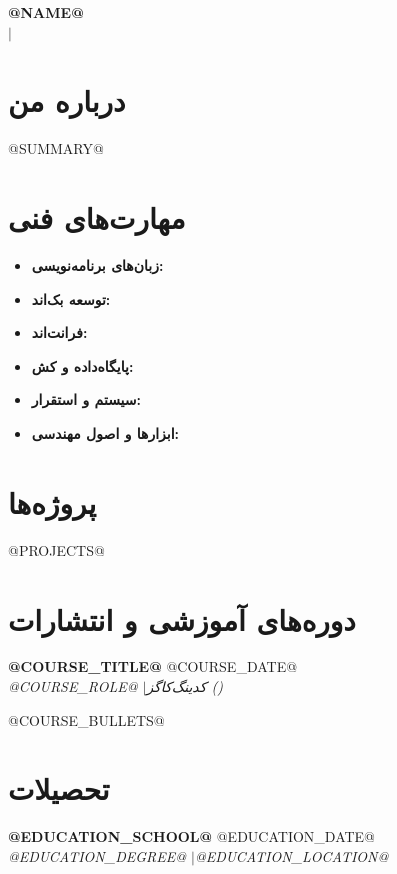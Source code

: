 \documentclass[a4paper,10pt]{article}
\begin{document}
\begin{center}
    {\textbf{\Huge @NAME@}} \\ \vspace{6pt}
    \small
    \href{mailto:@EMAIL_URL@}{} \quad$|$\quad
    \href{@GITHUB_URL@}{}
\end{center}

\section{درباره من}
\small{
@SUMMARY@
}

\section{مهارت‌های فنی}
\begin{itemize}[leftmargin=*, label={--}]
    \item \textbf{زبان‌های برنامه‌نویسی:} 
    \item \textbf{توسعه بک‌اند:} 
    \item \textbf{فرانت‌اند:} 
    \item \textbf{پایگاه‌داده و کش:} 
    \item \textbf{سیستم و استقرار:} 
    \item \textbf{ابزارها و اصول مهندسی:} 
\end{itemize}

\section{پروژه‌ها}
@PROJECTS@

\section{دوره‌های آموزشی و انتشارات}

\noindent\textbf{@COURSE_TITLE@} \hfill @COURSE_DATE@ \\
\textit{\small @COURSE_ROLE@ \quad$|$\quad کدینگ‌کاگز ()}
\begin{itemize}[leftmargin=*, label={$\bullet$}]
@COURSE_BULLETS@
\end{itemize}


\section{تحصیلات}

\noindent\textbf{@EDUCATION_SCHOOL@} \hfill @EDUCATION_DATE@ \\
\textit{\small @EDUCATION_DEGREE@ \quad$|$\quad @EDUCATION_LOCATION@}
\end{document}
